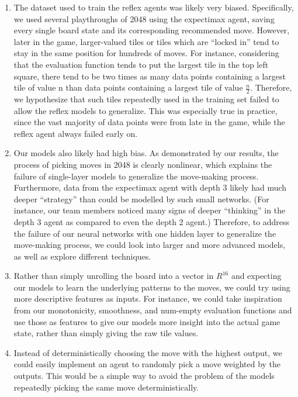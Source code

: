 \documentclass[9pt,twocolumn]{article}
\begin{document}
\begin{enumerate}[1)]

\item The dataset used to train the reflex agents was likely very biased. Specifically, we used several playthroughs of 2048 using the expectimax agent, saving every single board state and its corresponding recommended move. However, later in the game, larger-valued tiles or tiles which are “locked in” tend to stay in the same position for hundreds of moves. For instance, considering that the evaluation function tends to put the largest tile in the top left square, there tend to be two times as many data points containing a largest tile of value n than data points containing a largest tile of value $\frac{n}{2}$. Therefore, we hypothesize that such tiles repeatedly used in the training set failed to allow the reflex models to generalize. This was especially true in practice, since the vast majority of data points were from late in the game, while the reflex agent always failed early on. 

\item Our models also likely had high bias. As demonstrated by our results, the process of picking moves in 2048 is clearly nonlinear, which explains the failure of single-layer models to generalize the move-making process. Furthermore, data from the expectimax agent with depth 3 likely had much deeper “strategy” than could be modelled by such small networks. (For instance, our team members noticed many signs of deeper “thinking” in the depth 3 agent as compared to even the depth 2 agent.) Therefore, to address the failure of our neural networks with one hidden layer to generalize the move-making process, we could look into larger and more advanced models, as well as explore different techniques. 

\item Rather than simply unrolling the board into a vector in $R^{16}$ and expecting our models to learn the underlying patterns to the moves, we could try using more descriptive features as inputs. For instance, we could take inspiration from our monotonicity, smoothness, and num-empty evaluation functions and use those as features to give our models more insight into the actual game state, rather than simply giving the raw tile values.

\item Instead of deterministically choosing the move with the highest output, we could easily implement an agent to randomly pick a move weighted by the outputs. This would be a simple way to avoid the problem of the models repeatedly picking the same move deterministically.

\end{enumerate}
\end{document}
